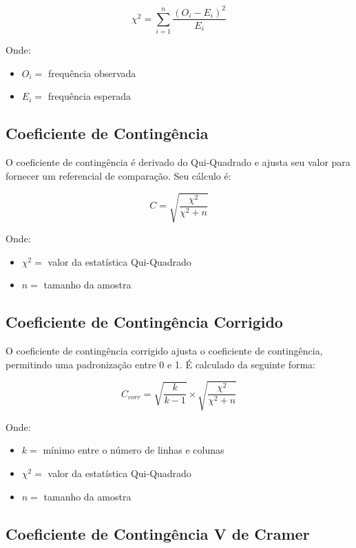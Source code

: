 \documentclass[
]{estat/estat}
\providecommand{\tightlist}{%
  \setlength{\itemsep}{0pt}\setlength{\parskip}{0pt}}\usepackage{longtable,booktabs,array}
\begin{document}
\[
\chi^2 = \sum_{i=1}^{n} \frac{(O_i-E_i)^2}{E_i}
\]

Onde:

\begin{itemize}
\tightlist
\item
  \(O_i =\) frequência observada
\item
  \(E_i =\) frequência esperada
\end{itemize}

\subsection{Coeficiente de
Contingência}\label{coeficiente-de-continguxeancia}

O coeficiente de contingência é derivado do Qui-Quadrado e ajusta seu
valor para fornecer um referencial de comparação. Seu cálculo é:

\[
C=\sqrt{\frac{\chi^2}{\chi^2+n}}
\]

Onde:

\begin{itemize}
\tightlist
\item
  \(\chi^2 =\) valor da estatística Qui-Quadrado
\item
  \(n =\) tamanho da amostra
\end{itemize}

\subsection{Coeficiente de Contingência
Corrigido}\label{coeficiente-de-continguxeancia-corrigido}

O coeficiente de contingência corrigido ajusta o coeficiente de
contingência, permitindo uma padronização entre 0 e 1. É calculado da
seguinte forma:

\[
C_{corr}= \sqrt{\frac{k}{k-1}} \times \sqrt{\frac{\chi^2}{\chi^2 + n}}
\]

Onde:

\begin{itemize}
\tightlist
\item
  \(k =\) mínimo entre o número de linhas e colunas
\item
  \(\chi^2 =\) valor da estatística Qui-Quadrado
\item
  \(n =\) tamanho da amostra
\end{itemize}

\subsection{Coeficiente de Contingência V de
Cramer}\label{coeficiente-de-continguxeancia-v-de-cramer}
\end{document}
